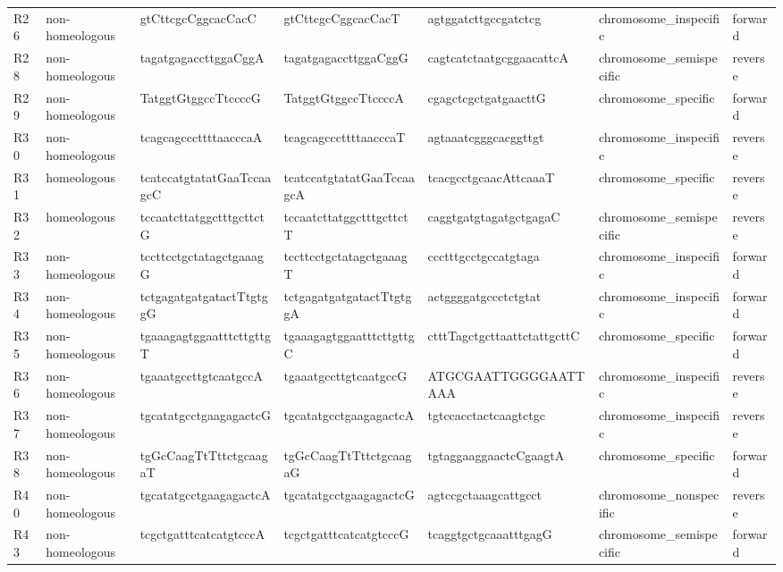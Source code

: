 \begin{sidewaystable}
\begin{localsize}{6}{9}
\begin{tabular}{lllllll}
 R26        & non-homeologous     & gtCttcgcCggcacCacC          & gtCttcgcCggcacCacT          & agtggatcttgccgatctcg        & chromosome\_inspecific   & forward       \\
 R28        & non-homeologous     & tagatgagaccttggaCggA        & tagatgagaccttggaCggG        & cagtcatctaatgcggaacattcA    & chromosome\_semispecific & reverse       \\
 R29        & non-homeologous     & TatggtGtggccTtccccG         & TatggtGtggccTtccccA         & cgagctcgctgatgaacttG        & chromosome\_specific     & forward       \\
 R30        & non-homeologous     & tcagcagcccttttaacccaA       & tcagcagcccttttaacccaT       & agtaaatcgggcacggttgt        & chromosome\_inspecific   & reverse       \\
 R31        & homeologous         & tcatccatgtatatGaaTccaagcC   & tcatccatgtatatGaaTccaagcA   & tcacgcctgcaacAttcaaaT       & chromosome\_specific     & reverse       \\
 R32        & homeologous         & tccaatcttatggctttgcttctG    & tccaatcttatggctttgcttctT    & caggtgatgtagatgctgagaC      & chromosome\_semispecific & reverse       \\
 R33        & non-homeologous     & tccttcctgctatagctgaaagG     & tccttcctgctatagctgaaagT     & ccctttgcctgccatgtaga        & chromosome\_inspecific   & forward       \\
 R34        & non-homeologous     & tctgagatgatgatactTtgtggG    & tctgagatgatgatactTtgtggA    & actggggatgccctctgtat        & chromosome\_inspecific   & forward       \\
 R35        & non-homeologous     & tgaaagagtggaatttcttgttgT    & tgaaagagtggaatttcttgttgC    & ctttTagctgcttaattctattgcttC & chromosome\_specific     & forward       \\
 R36        & non-homeologous     & tgaaatgccttgtcaatgccA       & tgaaatgccttgtcaatgccG       & ATGCGAATTGGGGAATTAAA        & chromosome\_inspecific   & reverse       \\
 R37        & non-homeologous     & tgcatatgcctgaagagactcG      & tgcatatgcctgaagagactcA      & tgtccacctactcaagtctgc       & chromosome\_inspecific   & reverse       \\
 R38        & non-homeologous     & tgGcCaagTtTttctgcaagaT      & tgGcCaagTtTttctgcaagaG      & tgtaggaaggaactcCgaagtA      & chromosome\_specific     & forward       \\
 R40        & non-homeologous     & tgcatatgcctgaagagactcA      & tgcatatgcctgaagagactcG      & agtccgctaaagcattgcct        & chromosome\_nonspecific  & reverse       \\
 R43        & non-homeologous     & tcgctgatttcatcatgtcccA      & tcgctgatttcatcatgtcccG      & tcaggtgctgcaaatttgagG       & chromosome\_semispecific & forward       \\
\bottomrule
\end{tabular}
\end{localsize}
\end{sidewaystable}
